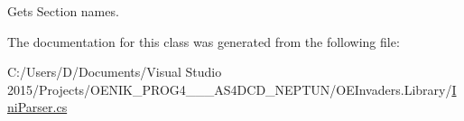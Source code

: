 Gets Section names. 



The documentation for this class was generated from the following file\+:\begin{DoxyCompactItemize}
\item 
C\+:/\+Users/\+D/\+Documents/\+Visual Studio 2015/\+Projects/\+O\+E\+N\+I\+K\+\_\+\+P\+R\+O\+G4\+\_\+\_\+\_\+\+A\+S4\+D\+C\+D\+\_\+\+N\+E\+P\+T\+U\+N/\+O\+E\+Invaders.\+Library/\mbox{\hyperlink{_ini_parser_8cs}{Ini\+Parser.\+cs}}\end{DoxyCompactItemize}
